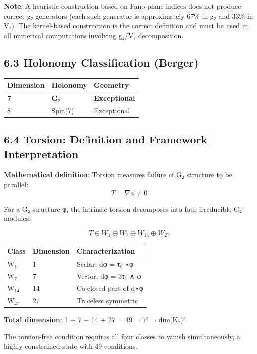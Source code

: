 \documentclass[11pt,a4paper]{article}
\begin{document}
\textbf{Note}: A heuristic construction based on Fano-plane indices does not produce correct g₂ generators (each such generator is approximately 67\% in g₂ and 33\% in V₇). The kernel-based construction is the correct definition and must be used in all numerical computations involving g₂/V₇ decomposition.

\subsection{6.3 Holonomy Classification (Berger)}\label{holonomy-classification-berger}

\begin{longtable}[]{@{}lll@{}}
\toprule\noalign{}
Dimension & Holonomy & Geometry \\
\midrule\noalign{}
\endhead
\bottomrule\noalign{}
\endlastfoot
\textbf{7} & \textbf{G₂} & \textbf{Exceptional} \\
8 & Spin(7) & Exceptional \\
\end{longtable}

\subsection{6.4 Torsion: Definition and Framework Interpretation}\label{torsion-definition-and-framework-interpretation}

\textbf{Mathematical definition}: Torsion measures failure of G₂ structure to be parallel: \[T = \nabla\phi \neq 0\]

For a G₂ structure φ, the intrinsic torsion decomposes into four irreducible G₂-modules:

\[T \in W_1 \oplus W_7 \oplus W_{14} \oplus W_{27}\]

\begin{longtable}[]{@{}lll@{}}
\toprule\noalign{}
Class & Dimension & Characterization \\
\midrule\noalign{}
\endhead
\bottomrule\noalign{}
\endlastfoot
W₁ & 1 & Scalar: dφ = τ₀ ⋆φ \\
W₇ & 7 & Vector: dφ = 3τ₁ ∧ φ \\
W₁₄ & 14 & Co-closed part of d⋆φ \\
W₂₇ & 27 & Traceless symmetric \\
\end{longtable}

\textbf{Total dimension}: 1 + 7 + 14 + 27 = 49 = 7² = dim(K₇)²

The torsion-free condition requires all four classes to vanish simultaneously, a highly constrained state with 49 conditions.
\end{document}
